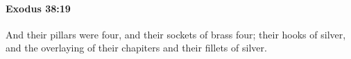
		\paragraph{Exodus 38:19} %
			\label{EXODUS-38-19}

			And their pillars were four, and their sockets of brass four; their hooks of silver, and the overlaying of their chapiters and their fillets of silver.


